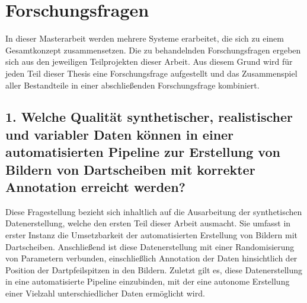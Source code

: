 

\section{Forschungsfragen}
\label{sec:forschungsfragen}

In dieser Masterarbeit werden mehrere Systeme erarbeitet, die sich zu einem Gesamtkonzept zusammensetzen. Die zu behandelnden Forschungsfragen ergeben sich aus den jeweiligen Teilprojekten dieser Arbeit. Aus diesem Grund wird für jeden Teil dieser Thesis eine Forschungsfrage aufgestellt und das Zusammenspiel aller Bestandteile in einer abschließenden Forschungsfrage kombiniert.

\subsection*{1. Welche Qualität synthetischer, realistischer und variabler Daten können in einer automatisierten Pipeline zur Erstellung von Bildern von Dartscheiben mit korrekter Annotation erreicht werden?}

Diese Fragestellung bezieht sich inhaltlich auf die Ausarbeitung der synthetischen Datenerstellung, welche den ersten Teil dieser Arbeit ausmacht. Sie umfasst in erster Instanz die Umsetzbarkeit der automatisierten Erstellung von Bildern mit Dartscheiben. Anschließend ist diese Datenerstellung mit einer Randomisierung von Parametern verbunden, einschließlich Annotation der Daten hinsichtlich der Position der Dartpfeilspitzen in den Bildern. Zuletzt gilt es, diese Datenerstellung in eine automatisierte Pipeline einzubinden, mit der eine autonome Erstellung einer Vielzahl unterschiedlicher Daten ermöglicht wird.

